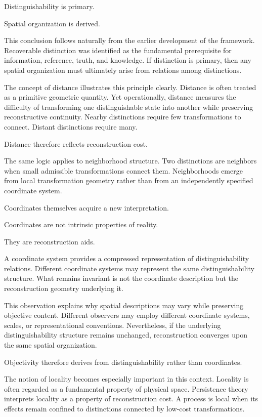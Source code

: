 \documentclass[12pt,oneside]{article}
\theoremstyle{definition}
\begin{document}
Distinguishability is primary.

Spatial organization is derived.

This conclusion follows naturally from the earlier development of the framework. Recoverable distinction was identified as the fundamental prerequisite for information, reference, truth, and knowledge. If distinction is primary, then any spatial organization must ultimately arise from relations among distinctions.

The concept of distance illustrates this principle clearly. Distance is often treated as a primitive geometric quantity. Yet operationally, distance measures the difficulty of transforming one distinguishable state into another while preserving reconstructive continuity. Nearby distinctions require few transformations to connect. Distant distinctions require many.

Distance therefore reflects reconstruction cost.

The same logic applies to neighborhood structure. Two distinctions are neighbors when small admissible transformations connect them. Neighborhoods emerge from local transformation geometry rather than from an independently specified coordinate system.

Coordinates themselves acquire a new interpretation.

Coordinates are not intrinsic properties of reality.

They are reconstruction aids.

A coordinate system provides a compressed representation of distinguishability relations. Different coordinate systems may represent the same distinguishability structure. What remains invariant is not the coordinate description but the reconstruction geometry underlying it.

This observation explains why spatial descriptions may vary while preserving objective content. Different observers may employ different coordinate systems, scales, or representational conventions. Nevertheless, if the underlying distinguishability structure remains unchanged, reconstruction converges upon the same spatial organization.

Objectivity therefore derives from distinguishability rather than coordinates.

The notion of locality becomes especially important in this context. Locality is often regarded as a fundamental property of physical space. Persistence theory interprets locality as a property of reconstruction cost. A process is local when its effects remain confined to distinctions connected by low-cost transformations.
\end{document}
